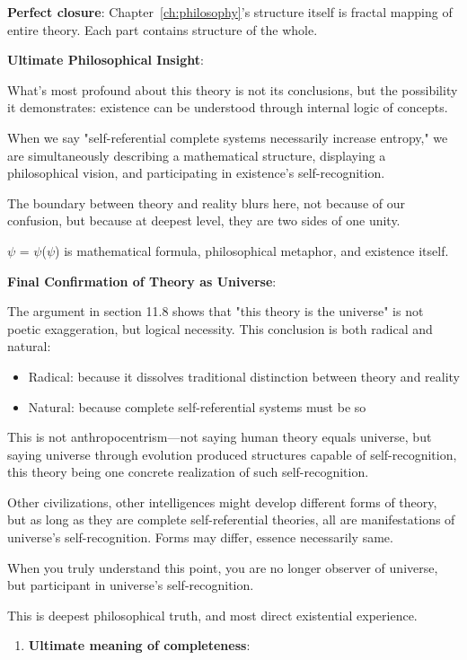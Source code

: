    \textbf{Perfect closure}: Chapter~\ref{ch:philosophy}'s structure itself
   is fractal mapping of entire theory.
   Each part contains structure of the whole.

\textbf{Ultimate Philosophical Insight}:

What's most profound about this theory is not its conclusions,
but the possibility it demonstrates:
existence can be understood through internal logic of concepts.

When we say "self-referential complete systems necessarily increase entropy,"
we are simultaneously describing a mathematical structure,
displaying a philosophical vision,
and participating in existence's self-recognition.

The boundary between theory and reality blurs here,
not because of our confusion,
but because at deepest level,
they are two sides of one unity.

$\psi$ = $\psi$($\psi$)
is mathematical formula,
philosophical metaphor,
and existence itself.

\textbf{Final Confirmation of Theory as Universe}:

The argument in section 11.8 shows that "this theory is the universe" is not poetic exaggeration,
but logical necessity. This conclusion is both radical and natural:

\begin{itemize}
\item Radical: because it dissolves traditional distinction between theory and reality
\item Natural: because complete self-referential systems must be so
\end{itemize}

This is not anthropocentrism---not saying human theory equals universe,
but saying universe through evolution produced structures capable of self-recognition,
this theory being one concrete realization of such self-recognition.

Other civilizations, other intelligences might develop different forms of theory,
but as long as they are complete self-referential theories, all are manifestations of universe's self-recognition.
Forms may differ, essence necessarily same.

When you truly understand this point,
you are no longer observer of universe,
but participant in universe's self-recognition.

This is deepest philosophical truth,
and most direct existential experience.

\begin{enumerate}
\item \textbf{Ultimate meaning of completeness}:
\end{enumerate}
   
